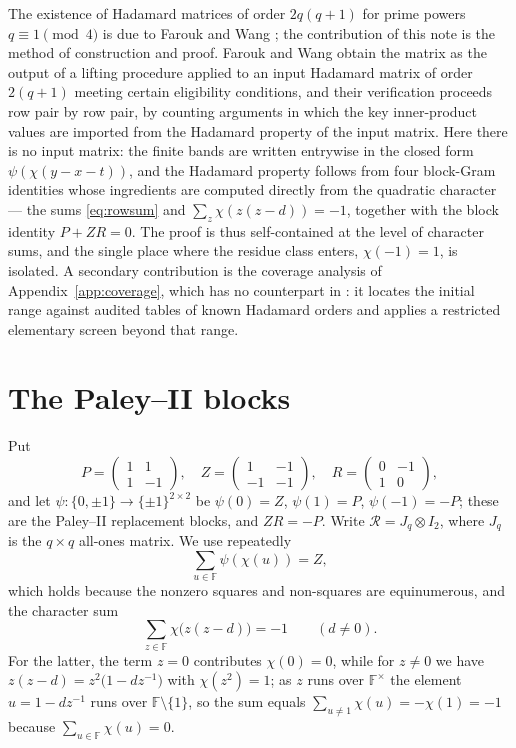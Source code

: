 \documentclass[11pt]{article}
\newcommand{\F}{\mathbb F}
\newcommand{\J}{J}
\newcommand{\Rcal}{\mathcal R}
\begin{document}
The existence of Hadamard matrices of order \(2q(q+1)\) for prime powers
\(q\equiv1\pmod4\) is due to Farouk and Wang \cite{FaroukWang2020}; the
contribution of this note is the method of
construction and proof.  Farouk and Wang obtain the matrix as the output
of a lifting procedure applied to an input Hadamard matrix of order
\(2(q+1)\) meeting certain eligibility conditions, and their verification
proceeds row pair by row pair, by counting arguments in which the key
inner-product values are imported from the Hadamard property of the
input matrix.  Here there is no input matrix: the finite bands are
written entrywise in the closed form \(\psi(\chi(y-x-t))\), and the
Hadamard property follows from four block-Gram identities whose
ingredients are computed directly from the quadratic character --- the
sums \eqref{eq:rowsum} and \(\sum_{z}\chi(z(z-d))=-1\), together with
the block identity \(P+ZR=0\).  The proof is thus self-contained at the
level of character sums, and the single place where the residue class
enters, \(\chi(-1)=1\), is isolated.  A secondary contribution is the
coverage analysis of Appendix~\ref{app:coverage}, which has no
counterpart in \cite{FaroukWang2020}: it locates the initial range
against audited tables of known Hadamard orders and applies a restricted
elementary screen beyond that range.

\section{The Paley--II blocks}

Put
\[
P=\begin{pmatrix}1&1\\ 1&-1\end{pmatrix},\quad
Z=\begin{pmatrix}1&-1\\ -1&-1\end{pmatrix},\quad
R=\begin{pmatrix}0&-1\\ 1&0\end{pmatrix},
\]
and let \(\psi\colon\{0,\pm1\}\to\{\pm1\}^{2\times2}\) be
\(\psi(0)=Z\), \(\psi(1)=P\), \(\psi(-1)=-P\); these are the Paley--II
replacement blocks, and \(ZR=-P\).  Write \(\Rcal=\J_q\otimes I_2\),
where \(\J_q\) is the \(q\times q\) all-ones matrix.  We use repeatedly
\[
        \sum_{u\in\F}\psi(\chi(u))=Z,
        \tag{2.1}\label{eq:rowsum}
\]
which holds because the nonzero squares and non-squares are equinumerous,
and the character sum
\[
        \sum_{z\in\F}\chi\bigl(z(z-d)\bigr)=-1\qquad(d\neq0).
        \tag{2.2}\label{eq:charsum}
\]
For the latter, the term \(z=0\) contributes \(\chi(0)=0\), while for
\(z\neq0\) we have \(z(z-d)=z^{2}\bigl(1-dz^{-1}\bigr)\) with
\(\chi(z^{2})=1\); as \(z\) runs over \(\F^{\times}\) the element
\(u=1-dz^{-1}\) runs over \(\F\setminus\{1\}\), so the sum equals
\(\sum_{u\neq1}\chi(u)=-\chi(1)=-1\) because \(\sum_{u\in\F}\chi(u)=0\).
\end{document}
